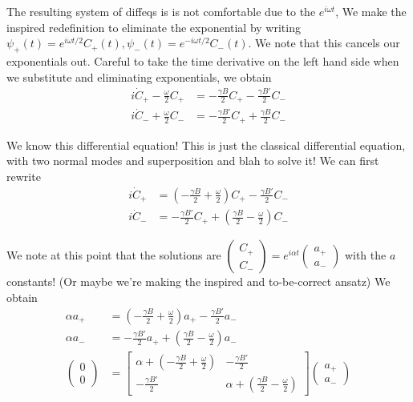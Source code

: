 \documentclass[10pt]{report}
\begin{document}
The resulting system of diffeqs is is not comfortable due to the $e^{i\omega t}$, We make the inspired redefinition to eliminate the exponential by writing $\psi_+(t) = e^{i\omega t/2}C_+(t), \psi_-(t) = e^{-i\omega t/2}C_-(t)$. We note that this cancels our exponentials out. Careful to take the time derivative on the left hand side when we substitute and eliminating exponentials, we obtain
\begin{align*}
    i\dot{C}_+ - \frac{\omega}{2}C_+ &= -\frac{\gamma B}{2}C_+ - \frac{\gamma B'}{2}C_-\\
    i\dot{C}_- + \frac{\omega}{2}C_- &= -\frac{\gamma B'}{2}C_+ + \frac{\gamma B}{2}C_-
\end{align*}

We know this differential equation! This is just the classical differential equation, with two normal modes and superposition and blah to solve it! We can first rewrite
\begin{align*}
    i\dot{C}_+  &= \left(-\frac{\gamma B}{2}+ \frac{\omega}{2}\right)C_+ - \frac{\gamma B'}{2}C_-\\
    i\dot{C}_- &= -\frac{\gamma B'}{2}C_+ + \left(\frac{\gamma B}{2}- \frac{\omega}{2}\right)C_- 
\end{align*}

We note at this point that the solutions are $\begin{pmatrix} C_+\\C_-\end{pmatrix} = e^{i\alpha t}\begin{pmatrix}a_+\\a_-\end{pmatrix}$ with the $a$ constants! (Or maybe we're making the inspired and to-be-correct ansatz) We obtain
\begin{align*}
    \alpha a_+  &= \left(-\frac{\gamma B}{2}+ \frac{\omega}{2}\right)a_+ - \frac{\gamma B'}{2}a_-\\
    \alpha a_- &= -\frac{\gamma B'}{2}a_+ + \left(\frac{\gamma B}{2}- \frac{\omega}{2}\right)a_- \\
    \begin{pmatrix}0\\0\end{pmatrix} &= \begin{bmatrix}
        \alpha + \left( -\frac{\gamma B}{2} + \frac{\omega}{2} \right) & -\frac{\gamma B'}{2}\\-\frac{\gamma B'}{2} & \alpha + \left( \frac{\gamma B}{2}-\frac{\omega}{2} \right)\end{bmatrix}\begin{pmatrix}a_+\\a_-\end{pmatrix}
\end{align*}
\end{document}
